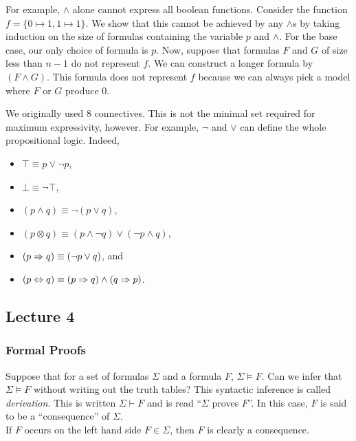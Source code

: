 For example, $\wedge$ alone cannot express all boolean functions. Consider the function $f=\{0\mapsto 1, 1\mapsto 1\}$. We show that this cannot be achieved by any $\wedge$s by taking induction on the size of formulas containing the variable $p$ and $\wedge$. For the base case, our only choice of formula is $p$. Now, suppose that formulas $F$ and $G$ of size less than $n-1$ do not represent $f$. We can construct a longer formula by $(F\wedge G)$. This formula does not represent $f$ because we can always pick a model where $F$ or $G$ produce $0$.

We originally used $8$ connectives. This is not the minimal set required for maximum expressivity, however. For example, $\neg$ and $\vee$ can define the whole propositional logic. Indeed,
\begin{itemize}
	\item $\top \equiv p \vee \neg p$,
	\item $\bot \equiv \neg \top$,
	\item $(p \wedge q) \equiv \neg(p \vee q)$,
	\item $(p\otimes q) \equiv (p \wedge \neg q) \vee (\neg p \wedge q)$,
	\item $(p\Rightarrow q) \equiv (\neg p \vee q)$, and
	\item $(p\Leftrightarrow q) \equiv (p\Rightarrow q) \wedge (q\Rightarrow p)$.
\end{itemize}

\subsection{Lecture 4}

\subsubsection{Formal Proofs}

Suppose that for a set of formulas $\Sigma$ and a formula $F$, $\Sigma\vDash F$. Can we infer that $\Sigma\vDash F$ without writing out the truth tables? This syntactic inference is called \textit{derivation}. This is written $\Sigma\vdash F$ and is read ``$\Sigma$ proves $F$''. In this case, $F$ is said to be a ``consequence'' of $\Sigma$.\\

If $F$ occurs on the left hand side $F\in\Sigma$, then $F$ is clearly a consequence.\\

